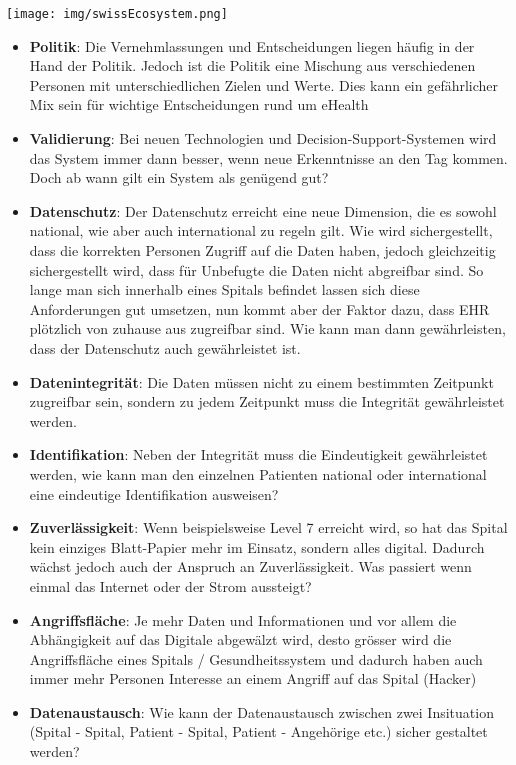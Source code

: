 \documentclass{report}
\newenvironment{Figure}
	{\par\medskip\noindent\minipage{\linewidth}}
	{\endminipage\par\medskip}
\theoremstyle{definition}
\theoremstyle{example}
\begin{document}
\begin{Figure}
   \centering
    \texttt{[image: img/swissEcosystem.png]}
        \label{fig:Abbildung des schweizer Ecosystem mit dem public-private-Mix}
    \end{Figure}

    \begin{itemize}
      \item \textbf{Politik}: Die Vernehmlassungen und Entscheidungen liegen häufig in der Hand der Politik. Jedoch ist die Politik eine Mischung aus verschiedenen Personen mit unterschiedlichen Zielen und Werte. Dies kann ein gefährlicher Mix sein für wichtige Entscheidungen rund um eHealth
      \item \textbf{Validierung}: Bei neuen Technologien und Decision-Support-Systemen wird das System immer dann besser, wenn neue Erkenntnisse an den Tag kommen. Doch ab wann gilt ein System als genügend gut?
      \item \textbf{Datenschutz}: Der Datenschutz erreicht eine neue Dimension, die es sowohl national, wie aber auch international zu regeln gilt. Wie wird sichergestellt, dass die korrekten Personen Zugriff auf die Daten haben, jedoch gleichzeitig sichergestellt wird, dass für Unbefugte die Daten nicht abgreifbar sind. So lange man sich innerhalb eines Spitals befindet lassen sich diese Anforderungen gut umsetzen, nun kommt aber der Faktor dazu, dass EHR plötzlich von zuhause aus zugreifbar sind. Wie kann man dann gewährleisten, dass der Datenschutz auch gewährleistet ist.
      \item \textbf{Datenintegrität}: Die Daten müssen nicht zu einem bestimmten Zeitpunkt zugreifbar sein, sondern zu jedem Zeitpunkt muss die Integrität gewährleistet werden. 
      \item \textbf{Identifikation}: Neben der Integrität muss die Eindeutigkeit gewährleistet werden, wie kann man den einzelnen Patienten national oder international eine eindeutige Identifikation ausweisen?
      \item \textbf{Zuverlässigkeit}: Wenn beispielsweise Level 7 erreicht wird, so hat das Spital kein einziges Blatt-Papier mehr im Einsatz, sondern alles digital. Dadurch wächst jedoch auch der Anspruch an Zuverlässigkeit. Was passiert wenn einmal das Internet oder der Strom aussteigt? 
      \item \textbf{Angriffsfläche}: Je mehr Daten und Informationen und vor allem die Abhängigkeit auf das Digitale abgewälzt wird, desto grösser wird die Angriffsfläche eines Spitals / Gesundheitssystem und dadurch haben auch immer mehr Personen Interesse an einem Angriff auf das Spital (Hacker)
      \item \textbf{Datenaustausch}: Wie kann der Datenaustausch zwischen zwei Insituation (Spital - Spital, Patient - Spital, Patient - Angehörige etc.) sicher gestaltet werden? 
   \end{itemize}
\end{document}
